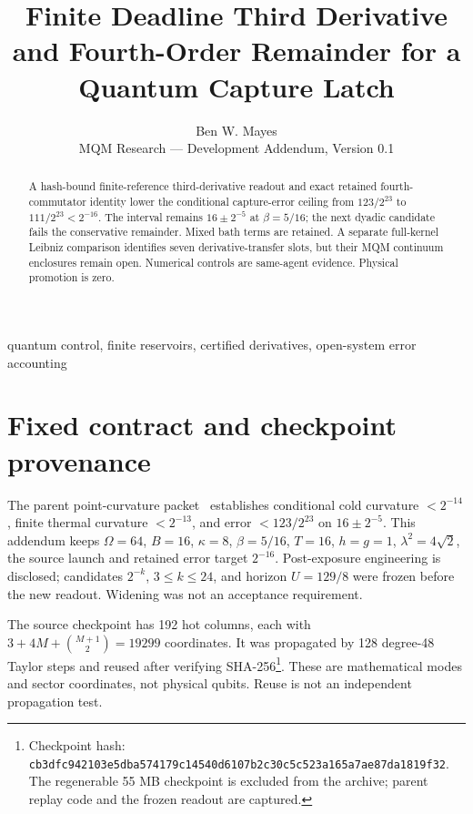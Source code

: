 \documentclass[a4paper,journal]{IEEEtran}
\title{Finite Deadline Third Derivative and Fourth-Order Remainder for a Quantum Capture Latch}
\author{Ben W. Mayes\\MQM Research --- Development Addendum, Version 0.1}
\begin{document}
\maketitle
\begin{abstract}
A hash-bound finite-reference third-derivative readout and exact retained fourth-commutator identity lower the conditional capture-error ceiling from $123/2^{23}$ to $111/2^{23}<2^{-16}$. The interval remains $16\pm2^{-5}$ at $\beta=5/16$; the next dyadic candidate fails the conservative remainder. Mixed bath terms are retained. A separate full-kernel Leibniz comparison identifies seven derivative-transfer slots, but their MQM continuum enclosures remain open. Numerical controls are same-agent evidence. Physical promotion is zero.
\end{abstract}
\begin{IEEEkeywords}quantum control, finite reservoirs, certified derivatives, open-system error accounting\end{IEEEkeywords}
\section{Fixed contract and checkpoint provenance}
The parent point-curvature packet~\cite{parent} establishes conditional cold curvature $<2^{-14}$, finite thermal curvature $<2^{-13}$, and error $<123/2^{23}$ on $16\pm2^{-5}$. This addendum keeps $\Omega=64$, $B=16$, $\kappa=8$, $\beta=5/16$, $T=16$, $h=g=1$, $\lambda^2=4\sqrt2$, the source launch and retained error target $2^{-16}$. Post-exposure engineering is disclosed; candidates $2^{-k}$, $3\le k\le24$, and horizon $U=129/8$ were frozen before the new readout. Widening was not an acceptance requirement.

The source checkpoint has 192 hot columns, each with $3+4M+\binom{M+1}{2}=19299$ coordinates. It was propagated by 128 degree-48 Taylor steps and reused after verifying SHA-256\footnote{Checkpoint hash: \texttt{cb3dfc942103e5dba574179c14540d610}\newline\texttt{7b2c30c5c523a165a7ae87da1819f32}. The regenerable 55 MB checkpoint is excluded from the archive; parent replay code and the frozen readout are captured.}. These are mathematical modes and sector coordinates, not physical qubits. Reuse is not an independent propagation test.
\end{document}
